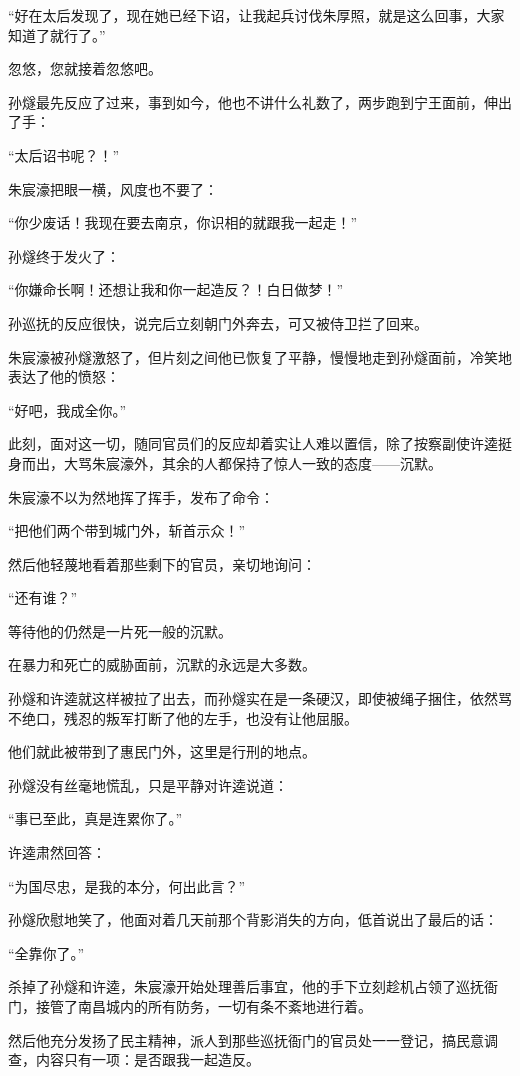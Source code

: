 \begin{multicols}{\theparacolNo}
“好在太后发现了，现在她已经下诏，让我起兵讨伐朱厚照，就是这么回事，大家知道了就行了。”

忽悠，您就接着忽悠吧。

孙燧最先反应了过来，事到如今，他也不讲什么礼数了，两步跑到宁王面前，伸出了手：

“太后诏书呢？！”

朱宸濠把眼一横，风度也不要了：

“你少废话！我现在要去南京，你识相的就跟我一起走！”

孙燧终于发火了：

“你嫌命长啊！还想让我和你一起造反？！白日做梦！”

孙巡抚的反应很快，说完后立刻朝门外奔去，可又被侍卫拦了回来。

朱宸濠被孙燧激怒了，但片刻之间他已恢复了平静，慢慢地走到孙燧面前，冷笑地表达了他的愤怒：

“好吧，我成全你。”

此刻，面对这一切，随同官员们的反应却着实让人难以置信，除了按察副使许逵挺身而出，大骂朱宸濠外，其余的人都保持了惊人一致的态度——沉默。

朱宸濠不以为然地挥了挥手，发布了命令：

“把他们两个带到城门外，斩首示众！”

然后他轻蔑地看着那些剩下的官员，亲切地询问：

“还有谁？”

等待他的仍然是一片死一般的沉默。

在暴力和死亡的威胁面前，沉默的永远是大多数。

孙燧和许逵就这样被拉了出去，而孙燧实在是一条硬汉，即使被绳子捆住，依然骂不绝口，残忍的叛军打断了他的左手，也没有让他屈服。

他们就此被带到了惠民门外，这里是行刑的地点。

孙燧没有丝毫地慌乱，只是平静对许逵说道：

“事已至此，真是连累你了。”

许逵肃然回答：

“为国尽忠，是我的本分，何出此言？”

孙燧欣慰地笑了，他面对着几天前那个背影消失的方向，低首说出了最后的话：

“全靠你了。”

杀掉了孙燧和许逵，朱宸濠开始处理善后事宜，他的手下立刻趁机占领了巡抚衙门，接管了南昌城内的所有防务，一切有条不紊地进行着。

然后他充分发扬了民主精神，派人到那些巡抚衙门的官员处一一登记，搞民意调查，内容只有一项：是否跟我一起造反。


\end{multicols}
